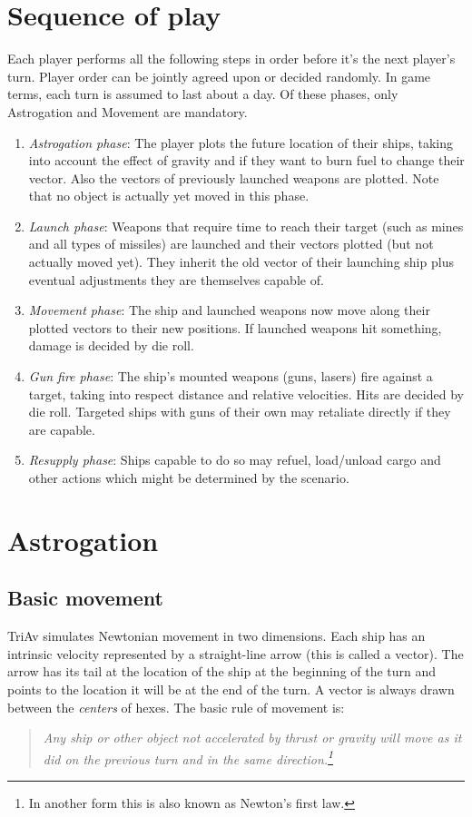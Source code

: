 \documentclass[a4paper,12pt,notitlepage,twocolumn]{article}
\begin{document}
\section{Sequence of play}
\label{sec:sequence_of_play}
Each player performs all the following steps in order before it's the
next player's turn. Player order can be jointly agreed upon or decided
randomly. In game terms, each turn is assumed to last about
a day. Of these phases, only Astrogation and Movement are mandatory. 
\begin{enumerate}
\item \emph{Astrogation phase}: The player plots the future location
  of their ships, taking into account the effect of
  gravity and if they want to burn fuel to change their vector. Also
  the vectors of previously launched weapons are plotted. Note that no
  object is actually yet moved in this phase.  
\item \emph{Launch phase}: Weapons that require time to reach their
  target (such as mines and all types of missiles) are launched and
  their vectors plotted (but not actually moved yet). They
  inherit the old vector of their launching ship plus eventual adjustments
  they are themselves capable of.  
\item \emph{Movement phase}: The ship and launched weapons now move along
  their plotted vectors to their new positions. If launched weapons hit
  something, damage is decided by die roll.
\item \emph{Gun fire phase}: The ship's mounted weapons (guns, lasers)
  fire against a target, taking into respect distance and
  relative velocities. Hits are decided by die roll. Targeted ships with guns 
  of their own may retaliate directly if they are capable. 
\item \emph{Resupply phase}: Ships capable to do so may refuel,
  load/unload cargo and other actions which might be determined by the
  scenario.
\end{enumerate}

\section{Astrogation}

\subsection{Basic movement}

\label{sec:astrogation}
TriAv simulates Newtonian movement in two dimensions. Each ship
has an intrinsic velocity represented by a straight-line arrow (this
is called a vector). The arrow has its tail at the location of the
ship at the beginning of the turn and points to the location it will
be at the end of the turn. A vector is always drawn between the
\emph{centers} of hexes. The basic rule of movement is: 
\begin{quotation}\noindent \emph{Any ship or other object not
        accelerated by thrust or gravity will move as it did on the
        previous turn and in the same direction.\footnote{In another
          form this is also known as Newton's first law.}}
\end{quotation}
\end{document}
